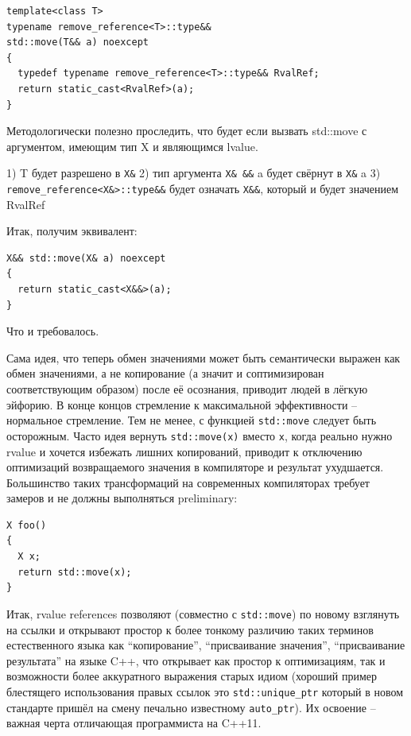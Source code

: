 \documentclass[a4paper,12pt,oneside]{article}
\begin{document}
\begin{lstlisting}
template<class T> 
typename remove_reference<T>::type&&
std::move(T&& a) noexcept
{
  typedef typename remove_reference<T>::type&& RvalRef;
  return static_cast<RvalRef>(a);
} 
\end{lstlisting}

Методологически полезно проследить, что будет если вызвать std::move с аргументом, имеющим тип X и являющимся lvalue.

1) T будет разрешено в \lstinline!X&!
2) тип аргумента \lstinline!X& &&! a будет свёрнут в \lstinline!X&! a
3) \lstinline!remove_reference<X&>::type&&! будет означать \lstinline!X&&!, который и будет значением RvalRef

Итак, получим эквивалент:

\begin{lstlisting}
X&& std::move(X& a) noexcept
{  
  return static_cast<X&&>(a);
}
\end{lstlisting}

Что и требовалось.

Сама идея, что теперь обмен значениями может быть семантически выражен как обмен значениями, а не копирование (а значит и соптимизирован соответствующим образом) после её осознания, приводит людей в лёгкую эйфорию. В конце концов стремление к максимальной эффективности -- нормальное стремление. Тем не менее, с функцией \lstinline!std::move! следует быть осторожным. Часто идея вернуть \lstinline!std::move(x)! вместо \lstinline!x!, когда реально нужно rvalue и хочется избежать лишних копирований, приводит к отключению оптимизаций возвращаемого значения в компиляторе и результат ухудшается. Большинство таких трансформаций на современных компиляторах требует замеров и не должны выполняться preliminary:

\begin{lstlisting}
X foo()
{
  X x;
  return std::move(x);
}
\end{lstlisting}

Итак, rvalue references позволяют (совместно с \lstinline!std::move!) по новому взглянуть на ссылки и открывают простор к более тонкому различию таких терминов естественного языка как ``копирование'', ``присваивание значения'', ``присваивание результата'' на языке C++, что открывает как простор к оптимизациям, так и возможности более аккуратного выражения старых идиом (хороший пример блестящего использования правых ссылок это \lstinline!std::unique_ptr! который в новом стандарте пришёл на смену печально известному \lstinline!auto_ptr!). Их освоение -- важная черта отличающая программиста на C++11.
\end{document}
